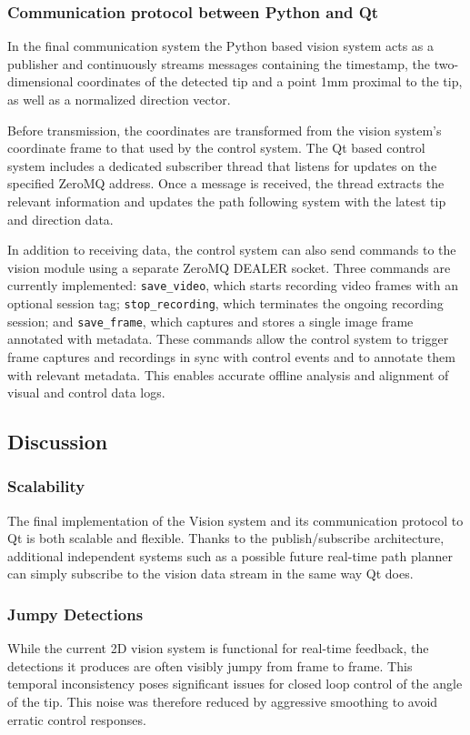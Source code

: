 \subsubsection{Communication protocol between Python and Qt}
In the final communication system the Python based vision system acts as a publisher and continuously streams messages containing the timestamp, the two-dimensional coordinates of the detected tip and a point 1mm proximal to the tip, as well as a normalized direction vector. 

Before transmission, the coordinates are transformed from the vision system's coordinate frame to that used by the control system. The Qt based control system includes a dedicated subscriber thread that listens for updates on the specified ZeroMQ address. Once a message is received, the thread extracts the relevant information and updates the path following system with the latest tip and direction data. 

In addition to receiving data, the control system can also send commands to the vision module using a separate ZeroMQ DEALER socket. Three commands are currently implemented: \texttt{save\_video}, which starts recording video frames with an optional session tag; \texttt{stop\_recording}, which terminates the ongoing recording session; and \texttt{save\_frame}, which captures and stores a single image frame annotated with metadata. These commands allow the control system to trigger frame captures and recordings in sync with control events and to annotate them with relevant metadata. This enables accurate offline analysis and alignment of visual and control data logs.

\subsection{Discussion}
\subsubsection{Scalability}
The final implementation of the Vision system and its communication protocol to Qt is both scalable and flexible. Thanks to the publish/subscribe architecture, additional independent systems such as a possible future real-time path planner can simply subscribe to the vision data stream in the same way Qt does.

\subsubsection{Jumpy Detections}
While the current 2D vision system is functional for real-time feedback, the detections it produces are often visibly jumpy from frame to frame. This temporal inconsistency poses significant issues for closed loop control of the angle of the tip. This noise was therefore reduced by aggressive smoothing to avoid erratic control responses. 

